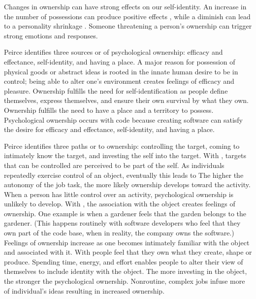 Changes in ownership can have strong effects on our self-identity. An increase in the number of possessions can produce positive effects \cite{Formanek1994}, while a diminish can lead to a personality shrinkage \cite{James1890}. Someone threatening a person's ownership can trigger strong emotions and responses.

Peirce \cite{Pierce2001} identifies three sources or  of psychological ownership: efficacy and effectance, self-identity, and having a place. A major reason for possession of physical goods or abstract ideas is rooted in the innate human desire to be in control; being able to alter one's environment creates feelings of efficacy and pleasure. Ownership fulfills the need for self-identification as people define themselves, express themselves, and ensure their own survival by what they own. Ownership fulfills the need to have a place and a territory to possess.  Psychological ownership occurs with code because creating software can satisfy the desire for efficacy and effectance, self-identity, and having a place.

Peirce identifies three paths or  to ownership: controlling the target, coming to intimately know the target, and investing the self into the target. With , targets that can be controlled are perceived to be part of the self.  As  individuals repeatedly exercise control of an object, eventually this leads to  The higher the autonomy of the job task, the more likely ownership develops toward the activity. When a person has little control over an activity, psychological ownership is unlikely to develop. With , the association with the object creates feelings of ownership. One example is when a gardener feels that the garden belongs to the gardener. (This happens routinely with software developers who feel that they own part of the code base, when in reality, the company owns the software.) Feelings of ownership increase as one becomes intimately familiar with the object and associated with it. With  people feel that they own what they create, shape or produce. Spending time, energy, and effort enables people to alter their view of themselves to include identity with the object. The more investing in the object, the stronger the psychological ownership. Nonroutine, complex jobs infuse more of individual's ideas resulting in increased ownership.

